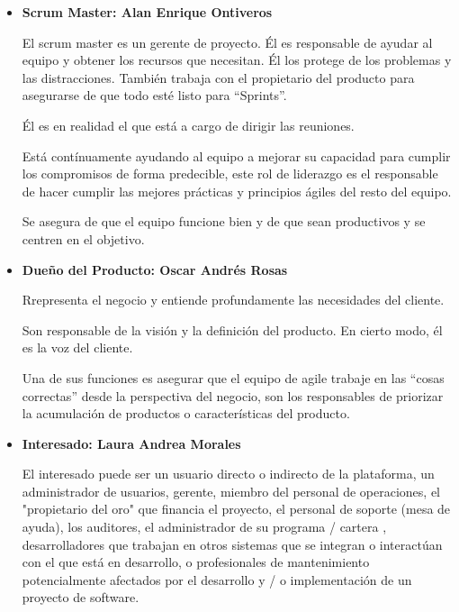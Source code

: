 \documentclass[12pt, fleqn]{report}                             %
\theoremstyle{break}                                            %
\begin{document}
        \begin{itemize}
            \item 
                \textbf{Scrum Master: Alan Enrique Ontiveros}
                
                El scrum master es un gerente de proyecto.
                Él es responsable de ayudar al equipo y obtener los recursos que necesitan. 
                Él los protege de los problemas y las distracciones. 
                También trabaja con el propietario del producto para asegurarse de que todo
                esté listo para ``Sprints''. 
                
                Él es en realidad el que está a cargo de dirigir las reuniones.
    
    
                Está contínuamente ayudando al equipo a mejorar su capacidad para cumplir los
                compromisos de forma predecible, este rol de liderazgo es el responsable de hacer
                cumplir las mejores prácticas y principios ágiles del resto del equipo.
    
                Se asegura de que el equipo funcione bien y de que sean productivos y se centren en
                el objetivo.

            \item 
                \textbf{Dueño del Producto: Oscar Andrés Rosas}
                
                Rrepresenta el negocio y entiende profundamente las necesidades del cliente. 

                Son responsable de la visión y la definición del producto. 
                En cierto modo, él es la voz del cliente. 
                
                Una de sus funciones es asegurar que el equipo de agile trabaje en las 
                ``cosas correctas'' desde la perspectiva del negocio, son los responsables de
                priorizar la acumulación de productos o características del producto.
            \item 
                \textbf{Interesado: Laura Andrea Morales}
                
                El interesado puede ser un usuario directo o indirecto de la plataforma, un administrador de usuarios, gerente, miembro del personal de operaciones, el "propietario del oro" que financia el proyecto, el personal de soporte (mesa de ayuda), los auditores, el administrador de su programa / cartera , desarrolladores que trabajan en otros sistemas que se integran o interactúan con el que está en desarrollo, o profesionales de mantenimiento potencialmente afectados por el desarrollo y / o implementación de un proyecto de software.
                

\end{itemize}
\end{document}
